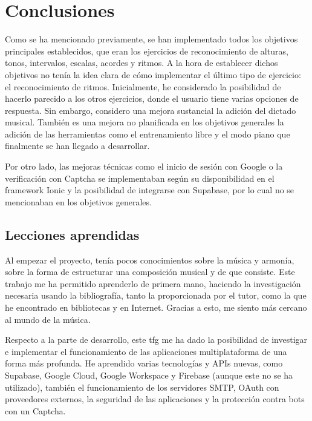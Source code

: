 \chapter{Conclusiones}
Como se ha mencionado previamente, se han implementado todos los objetivos principales establecidos, que eran los ejercicios de reconocimiento de alturas, tonos, intervalos, escalas, acordes y ritmos. A la hora de establecer dichos objetivos no tenía la idea clara de cómo implementar el último tipo de ejercicio: el reconocimiento de ritmos. Inicialmente, he considerado la posibilidad de hacerlo parecido a los otros ejercicios, donde el usuario tiene varias opciones de respuesta. Sin embargo, considero una mejora sustancial la adición del dictado musical. También es una mejora no planificada en los objetivos generales la adición de las herramientas como el entrenamiento libre y el modo piano que finalmente se han llegado a desarrollar.
\par Por otro lado, las mejoras técnicas como el inicio de sesión con Google o la verificación con Captcha se implementaban según su disponibilidad en el framework Ionic y la posibilidad de integrarse con Supabase, por lo cual no se mencionaban en los objetivos generales.
\section{Lecciones aprendidas}
Al empezar el proyecto, tenía pocos conocimientos sobre la música y armonía, sobre la forma de estructurar una composición musical y de que consiste. Este trabajo me ha permitido aprenderlo de primera mano, haciendo la investigación necesaria usando la bibliografía, tanto la proporcionada por el tutor, como la que he encontrado en bibliotecas y en Internet. Gracias a esto, me siento más cercano al mundo de la música.
\par Respecto a la parte de desarrollo, este \gls{tfg} me ha dado la posibilidad de investigar e implementar el funcionamiento de las aplicaciones multiplataforma de una forma más profunda. He aprendido varias tecnologías y APIs nuevas, como Supabase, Google Cloud, Google Workspace y Firebase (aunque este no se ha utilizado), también el funcionamiento de los servidores SMTP, OAuth con proveedores externos, la seguridad de las aplicaciones y la protección contra bots con un Captcha.
